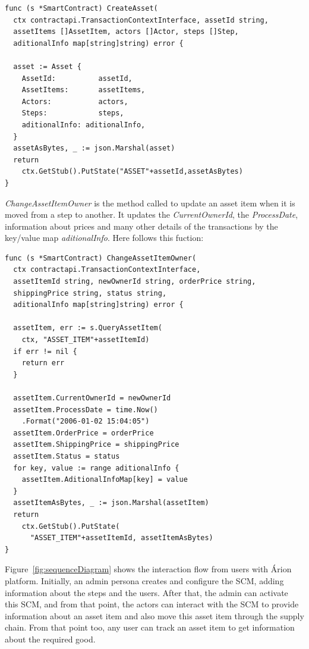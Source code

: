 \begin{lstlisting}
func (s *SmartContract) CreateAsset(
  ctx contractapi.TransactionContextInterface, assetId string, 
  assetItems []AssetItem, actors []Actor, steps []Step, 
  aditionalInfo map[string]string) error {
  
  asset := Asset {
    AssetId:          assetId,
    AssetItems:       assetItems,
    Actors:           actors,
    Steps:            steps,
    aditionalInfo: aditionalInfo,
  }
  assetAsBytes, _ := json.Marshal(asset)
  return 
    ctx.GetStub().PutState("ASSET"+assetId,assetAsBytes)
}
\end{lstlisting}

\textit{ChangeAssetItemOwner} is the method called to update an asset item when it is moved from a step to another. It updates the \textit{CurrentOwnerId}, the \textit{ProcessDate}, information about prices and many other details of the transactions by the key/value map \textit{  aditionalInfo}. Here follows this fuction:

\begin{lstlisting}
func (s *SmartContract) ChangeAssetItemOwner(
  ctx contractapi.TransactionContextInterface, 
  assetItemId string, newOwnerId string, orderPrice string,
  shippingPrice string, status string, 
  aditionalInfo map[string]string) error {
  
  assetItem, err := s.QueryAssetItem(
    ctx, "ASSET_ITEM"+assetItemId)
  if err != nil {
    return err
  }

  assetItem.CurrentOwnerId = newOwnerId
  assetItem.ProcessDate = time.Now()
    .Format("2006-01-02 15:04:05")
  assetItem.OrderPrice = orderPrice
  assetItem.ShippingPrice = shippingPrice
  assetItem.Status = status
  for key, value := range aditionalInfo {
    assetItem.AditionalInfoMap[key] = value
  }
  assetItemAsBytes, _ := json.Marshal(assetItem)
  return 
    ctx.GetStub().PutState(
      "ASSET_ITEM"+assetItemId, assetItemAsBytes)
}
\end{lstlisting}

Figure~\ref{fig:sequenceDiagram} shows the interaction flow from users with Árion platform. Initially, an admin persona creates and configure the SCM, adding information about the steps and the users. After that, the admin can activate this SCM, and from that point, the actors can interact with the SCM to provide information about an asset item and also move this asset item through the supply chain. From that point too, any user can track an asset item to get information about the required good.

